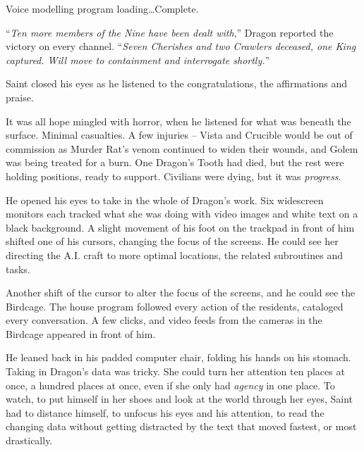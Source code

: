Voice modelling program loading\ldots Complete.



``\emph{Ten more members of the Nine have been dealt with},'' Dragon reported the victory on every channel.  ``\emph{Seven Cherishes and two Crawlers deceased, one King captured.  Will move to containment and interrogate shortly.}''



\blacksquare



Saint closed his eyes as he listened to the congratulations, the affirmations and praise.



It was all hope mingled with horror, when he listened for what was beneath the surface.  Minimal casualties.  A few injuries – Vista and Crucible would be out of commission as Murder Rat's venom continued to widen their wounds, and Golem was being treated for a burn.  One Dragon's Tooth had died, but the rest were holding positions, ready to support.  Civilians were dying, but it was \emph{progress}.



He opened his eyes to take in the whole of Dragon's work.  Six widescreen monitors each tracked what she was doing with video images and white text on a black background.  A slight movement of his foot on the trackpad in front of him shifted one of his cursors, changing the focus of the screens.  He could see her directing the A.I. craft to more optimal locations, the related subroutines and tasks.



Another shift of the cursor to alter the focus of the screens, and he could see the Birdcage.  The house program followed every action of the residents, cataloged every conversation.  A few clicks, and video feeds from the cameras in the Birdcage appeared in front of him.



He leaned back in his padded computer chair, folding his hands on his stomach.  Taking in Dragon's data was tricky.  She could turn her attention ten places at once, a hundred places at once, even if she only had \emph{agency} in one place.  To watch, to put himself in her shoes and look at the world through her eyes, Saint had to distance himself, to unfocus his eyes and his attention, to read the changing data without getting distracted by the text that moved fastest, or most drastically.




